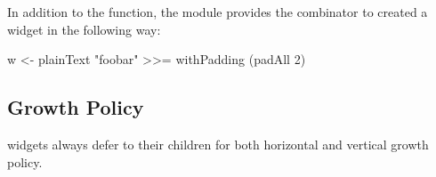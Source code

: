 In addition to the  function, the  module
provides the  combinator to created a 
widget in the following way:

\begin{haskellcode}
 w <- plainText "foobar" >>= withPadding (padAll 2)
\end{haskellcode}

\subsection{Growth Policy}

 widgets always defer to their children for both horizontal
and vertical growth policy.
